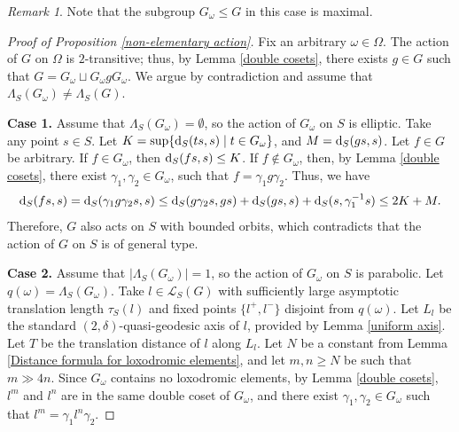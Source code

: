 \documentclass[11pt,letterpaper]{article}
\renewcommand{\d}{{\rm d}}
\renewcommand{\d}{{\rm d}}
\theoremstyle{definition}
\theoremstyle{remark}
\newtheorem{rem}[thm]{Remark}
\begin{document}
\begin{rem}\label{maximality of H}
    Note that the subgroup $G_\omega \leq G$ in this case is maximal.
\end{rem}

\begin{proof}[Proof of Proposition \ref{non-elementary action}]

Fix an arbitrary $\omega \in \Omega$. The action of $G$ on $\Omega$ is $2$-transitive; thus, by Lemma \ref{double cosets}, there exists $g \in G$ such that $G=G_\omega \sqcup G_\omega gG_\omega$. %
We argue by contradiction and assume that $\Lambda_S(G_\omega) \neq \Lambda_S(G)$. %

{\bf Case 1.} Assume that $\Lambda_S(G_\omega)=\emptyset$, so the action of $G_\omega$ on $S$ is elliptic. Take any point $s\in S$. Let $K=\sup\{\d_S(ts,s) \mid t \in G_\omega\}$, and $M=\d_S(gs,s)$. Let $f \in G$ be arbitrary. If $f \in G_\omega$, then $\d_S(fs, s) \leq K$. If $f \notin G_\omega$, then, by Lemma \ref{double cosets}, there exist $\gamma_1, \gamma_2 \in G_\omega$, such that $f=\gamma_1g\gamma_2$. Thus, we have 
$$
\d_S(fs,s)=\d_S(\gamma_1g\gamma_2s,s)\leq \d_S(g\gamma_2s,gs)+\d_S(gs,s)+\d_S(s,\gamma_1^{-1}s) \leq 2K+M. 
$$
Therefore, $G$ also acts on $S$ with bounded orbits, which contradicts that the action of $G$ on $S$ is of general type.

{\bf Case 2.} %
 Assume that $|\Lambda_S(G_\omega)|=1$, so the action of $G_\omega$ on $S$ is parabolic. Let $q(\omega)=\Lambda_S(G_\omega)$. Take $l \in \mathcal{L}_S(G)$ with sufficiently large asymptotic translation length $\tau_S(l)$ and fixed points $\{l^+, l^-\}$ disjoint from $q(\omega)$. 
Let $L_l$ be the standard $(2,\delta)$-quasi-geodesic axis of $l$, provided by Lemma \ref{uniform axis}. Let $T$ be the translation distance of $l$ along $L_l$. Let $N$ be a constant from Lemma \ref{Distance formula for loxodromic elements}, and let $m, n \geq N$ be such that $m \gg 4n$. Since $G_\omega$ contains no loxodromic elements, by Lemma \ref{double cosets}, $l^m$ and $l^n$ are in the same double coset of $G_\omega$, and there exist $\gamma_1, \gamma_2 \in G_\omega$ such that $l^m=\gamma_1l^n\gamma_2$.


\end{proof}
\end{document}
